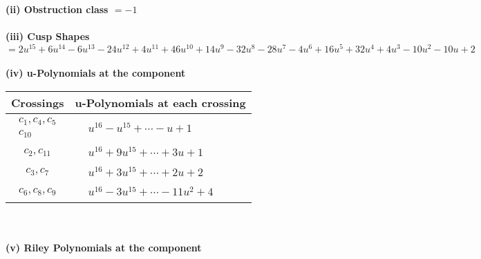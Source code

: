 \documentclass[1p]{elsarticle_modified}
\theoremstyle{definition}
\begin{document}
\flushleft \textbf{(ii) Obstruction class $= -1$}\\~\\
\flushleft \textbf{(iii) Cusp Shapes $= 2 u^{15}+6 u^{14}-6 u^{13}-24 u^{12}+4 u^{11}+46 u^{10}+14 u^9-32 u^8-28 u^7-4 u^6+16 u^5+32 u^4+4 u^3-10 u^2-10 u+2$}\\~\\
\newpage\renewcommand{\arraystretch}{1}
\flushleft \textbf{(iv) u-Polynomials at the component}\newline \\
\begin{tabular}{m{50pt}|m{274pt}}
Crossings & \hspace{64pt}u-Polynomials at each crossing \\
\hline $$\begin{aligned}c_{1},c_{4},c_{5}\\c_{10}\end{aligned}$$&$\begin{aligned}
&u^{16}- u^{15}+\cdots- u+1
\end{aligned}$\\
\hline $$\begin{aligned}c_{2},c_{11}\end{aligned}$$&$\begin{aligned}
&u^{16}+9 u^{15}+\cdots+3 u+1
\end{aligned}$\\
\hline $$\begin{aligned}c_{3},c_{7}\end{aligned}$$&$\begin{aligned}
&u^{16}+3 u^{15}+\cdots+2 u+2
\end{aligned}$\\
\hline $$\begin{aligned}c_{6},c_{8},c_{9}\end{aligned}$$&$\begin{aligned}
&u^{16}-3 u^{15}+\cdots-11 u^2+4
\end{aligned}$\\
\hline
\end{tabular}\\~\\
\newpage\renewcommand{\arraystretch}{1}
\flushleft \textbf{(v) Riley Polynomials at the component}\newline \\
\end{document}
